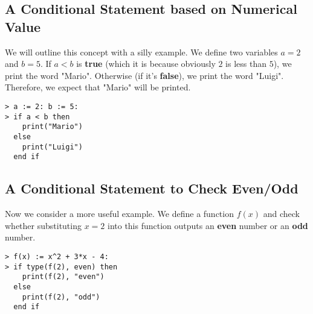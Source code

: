 \subsection{A Conditional Statement based on Numerical Value}

We will outline this concept with a silly example. We define two variables $a=2$ and $b=5$. If $a<b$ is \textbf{true} (which it is because obviously $2$ is less than $5$), we print the word "Mario". Otherwise (if it's \textbf{false}), we print the word "Luigi". Therefore, we expect that "Mario" will be printed.
\begin{maplegroup}
\begin{mapleinput}
\begin{verbatim}
> a := 2: b := 5:
> if a < b then
    print("Mario")
  else
    print("Luigi")
  end if
\end{verbatim}
\end{mapleinput}
\mapleresult
\begin{maplelatex}
\end{maplelatex}
\end{maplegroup}

\subsection{A Conditional Statement to Check Even/Odd}

Now we consider a more useful example. We define a function $f(x)$ and check whether substituting $x=2$ into this function outputs an \textbf{even} number or an \textbf{odd} number. 

\begin{maplegroup}
\begin{mapleinput}
\begin{verbatim}
> f(x) := x^2 + 3*x - 4:
> if type(f(2), even) then
    print(f(2), "even")
  else
    print(f(2), "odd")
  end if
\end{verbatim}
\end{mapleinput}
\mapleresult
\begin{maplelatex}
\end{maplelatex}
\end{maplegroup}

